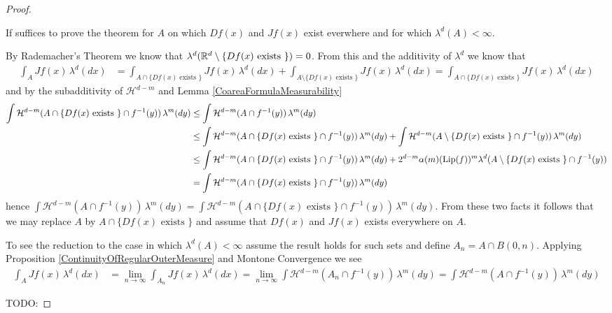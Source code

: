 \begin{proof}
\begin{clm}If suffices to prove the theorem for $A$ on which $Df(x)$ and $Jf(x)$ exist everwhere and for which $\lambda^d(A) < \infty$.
\end{clm}
By Rademacher's Theorem we know that $\lambda^d(\mathbb{R}^d \setminus \lbrace Df(x) \text{ exists } \rbrace) =0$.  From this and the additivity of $\lambda^d$ we know that
\begin{align*}
\int_A Jf(x) \, \lambda^d(dx) &= \int_{A \cap \lbrace Df(x) \text{ exists } \rbrace}  Jf(x) \, \lambda^d(dx) + \int_{A \setminus \lbrace Df(x) \text{ exists } \rbrace}  Jf(x) \, \lambda^d(dx) 
= \int_{A \cap \lbrace Df(x) \text{ exists } \rbrace}  Jf(x) \, \lambda^d(dx) 
\end{align*}
and by the subadditivity of $\mathcal{H}^{d-m}$ and Lemma \ref{CoareaFormulaMeasurability}
\begin{align*}
\int \mathcal{H}^{d-m}(A \cap \lbrace Df(x) \text{ exists } \rbrace \cap  f^{-1}(y)) \, \lambda^m(dy) &\leq \int \mathcal{H}^{d-m}(A \cap f^{-1}(y)) \, \lambda^m(dy) \\
&\leq \int \mathcal{H}^{d-m}(A \cap \lbrace Df(x) \text{ exists } \rbrace \cap f^{-1}(y)) \, \lambda^m(dy) 
+ \int \mathcal{H}^{d-m}(A \setminus \lbrace Df(x) \text{ exists } \rbrace \cap f^{-1}(y)) \, \lambda^m(dy) \\
&\leq \int \mathcal{H}^{d-m}(A \cap \lbrace Df(x) \text{ exists } \rbrace \cap f^{-1}(y)) \, \lambda^m(dy)  + 
2^{d-m} \alpha(m) (\operatorname*{Lip}(f))^m \lambda^d(A \setminus \lbrace Df(x) \text{ exists } \rbrace \cap f^{-1}(y)) \\
&=\int \mathcal{H}^{d-m}(A \cap \lbrace Df(x) \text{ exists } \rbrace \cap f^{-1}(y)) \, \lambda^m(dy)
\end{align*}
hence $\int \mathcal{H}^{d-m}(A \cap f^{-1}(y)) \, \lambda^m(dy)  = \int \mathcal{H}^{d-m}(A \cap \lbrace Df(x) \text{ exists } \rbrace \cap f^{-1}(y)) \, \lambda^m(dy)$.
From these two facts it follows that we may replace $A$ by $A \cap \lbrace Df(x) \text{ exists } \rbrace$ and assume that $Df(x)$ and $Jf(x)$ exists everywhere on $A$.

To see the reduction to the case in which $\lambda^d(A) < \infty$ assume the result holds for such sets and define $A_n = A \cap B(0,n)$.  Applying Proposition \ref{ContinuityOfRegularOuterMeasure} and 
Montone Convergence we see
\begin{align*}
\int_A Jf(x) \, \lambda^d(dx) &= \lim_{n \to \infty}\int_{A_n} Jf(x) \, \lambda^d(dx) = \lim_{n \to \infty} \int \mathcal{H}^{d-m}(A_n \cap f^{-1}(y)) \, \lambda^m(dy) = \int \mathcal{H}^{d-m}(A \cap f^{-1}(y)) \, \lambda^m(dy)
\end{align*}


TODO:
\end{proof}
